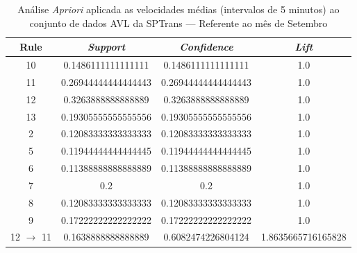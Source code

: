 \documentclass[
	12pt,				%
	oneside,			%
	a4paper,			%
	english,			%
	brazil				%
	]{abntex2ppgsi}
\begin{document}
\begin{apendicesenv}
\begin{table}[!htb]
\centering
\caption {Análise \textit{Apriori} aplicada as velocidades médias (intervalos de 5 minutos) ao conjunto de dados AVL da SPTrans --- Referente ao mês de Setembro}
\label {tab:aprioriSeptember}
\begin{tabular}{c|c|c|c}
\hline
\textbf{Rule} & \textit{\textbf{Support}} & \textit{\textbf{Confidence}} & \textit{\textbf{Lift}} \\
\hline
10 &  0.1486111111111111 &  0.1486111111111111 &  1.0\\
\hline
11 &  0.26944444444444443 &  0.26944444444444443 &  1.0\\
\hline
12 &  0.3263888888888889 &  0.3263888888888889 &  1.0\\
\hline
13 &  0.19305555555555556 &  0.19305555555555556 &  1.0\\
\hline
2 &  0.12083333333333333 &  0.12083333333333333 &  1.0\\
\hline
5 &  0.11944444444444445 &  0.11944444444444445 &  1.0\\
\hline
6 &  0.11388888888888889 &  0.11388888888888889 &  1.0\\
\hline
7 &  0.2 &  0.2 &  1.0\\
\hline
8 &  0.12083333333333333 &  0.12083333333333333 &  1.0\\
\hline
9 &  0.17222222222222222 &  0.17222222222222222 &  1.0\\
\hline
12 $\rightarrow$ 11 &  0.1638888888888889 &  0.6082474226804124 &  1.8635665716165828\\
\hline
\end{tabular}
\end{table}



\end{apendicesenv}
\end{document}
